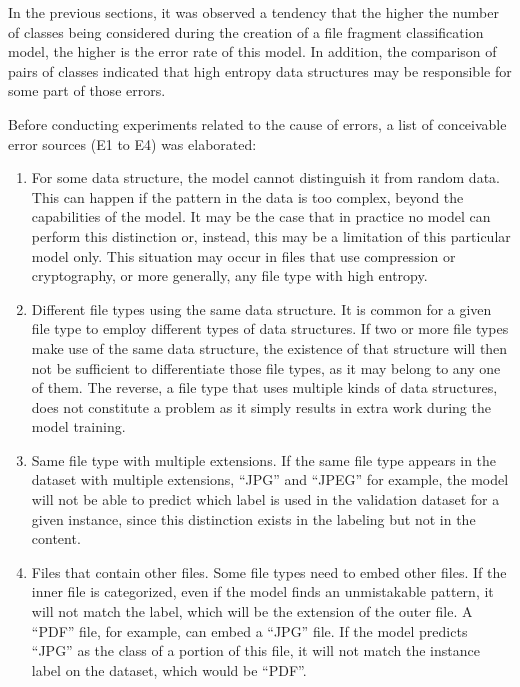 In the previous sections, it was observed a tendency that the higher the number of classes being considered during the creation of a file fragment classification model, the higher is the error rate of this model. In addition, the comparison of pairs of classes indicated that high entropy data structures may be responsible for some part of those errors.

Before conducting experiments related to the cause of errors, a list of conceivable error sources (E1 to E4) was elaborated:
\begin{enumerate}[itemindent=\parindent,label=\textbf{E\arabic*.}]
    \item For some data structure, the model cannot distinguish it from random data. This can happen if the pattern in the data is too complex, beyond the capabilities of the model. It may be the case that in practice no model can perform this distinction or, instead, this may be a limitation of this particular model only. This situation may occur in files that use compression or cryptography, or more generally, any file type with high entropy.

    \item Different file types using the same data structure. It is common for a given file type to employ different types of data structures. If two or more file types make use of the same data structure, the existence of that structure will then not be sufficient to differentiate those file types, as it may belong to any one of them.
    The reverse, a file type that uses multiple kinds of data structures, does not constitute a problem as it simply results in extra work during the model training.

    \item Same file type with multiple extensions. If the same file type appears in the dataset with multiple extensions, ``JPG'' and ``JPEG'' for example, the model will not be able to predict which label is used in the validation dataset for a given instance, since this distinction exists in the labeling but not in the content.

    \item Files that contain other files. Some file types need to embed other files. If the inner file is categorized, even if the model finds an unmistakable pattern, it will not match the label, which will be the extension of the outer file. A ``PDF'' file, for example, can embed a ``JPG'' file. If the model predicts ``JPG'' as the class of a portion of this file, it will not match the instance label on the dataset, which would be ``PDF''.
\end{enumerate}

